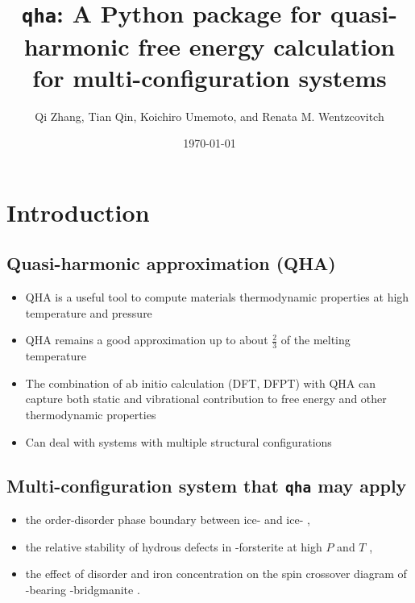 \documentclass[13pt,aspectratio=169]{beamer}
\author[Qi Zhang et. al.]{Qi Zhang, Tian Qin, Koichiro Umemoto, and Renata M. Wentzcovitch}
\title[\texttt{qha}]{\texttt{qha}: A Python package for quasi-harmonic free energy calculation for multi-configuration systems\cite{qin2018qha}}
\institute{Columbia University}
\date{\today}
\newcommand*{\RMN}[1]{\uppercase\expandafter{\romannumeral#1}}
\begin{document}
\begin{frame}
	\titlepage
\end{frame}

\section{Introduction}

\subsection{Quasi-harmonic approximation (QHA)}
\begin{frame}{\subsecname}
	\begin{itemize}
		\item QHA is a useful tool to compute materials thermodynamic properties at high temperature and pressure
		\item QHA remains a good approximation up to about $\frac{ 2 }{ 3 }$ of the melting temperature
		\item The combination of ab initio calculation (DFT, DFPT) with QHA can capture both static and vibrational contribution to free energy and other thermodynamic properties
		\item Can deal with systems with multiple structural configurations
	\end{itemize}
\end{frame}

\subsection{Multi-configuration system that \texttt{qha} may apply}
\begin{frame}{\subsecname}
	\begin{itemize}
		\item the order-disorder phase boundary between ice-\RMN{8} and ice-\RMN{7} \cite{umemoto2010order},
		\item the relative stability of hydrous defects in -forsterite at high $P$ and $T$ \cite{qin2018ab},
		\item the effect of disorder and iron concentration on the spin crossover diagram of -bearing -bridgmanite \cite{shukla2016spin}.
	\end{itemize}
\end{frame}
\end{document}

